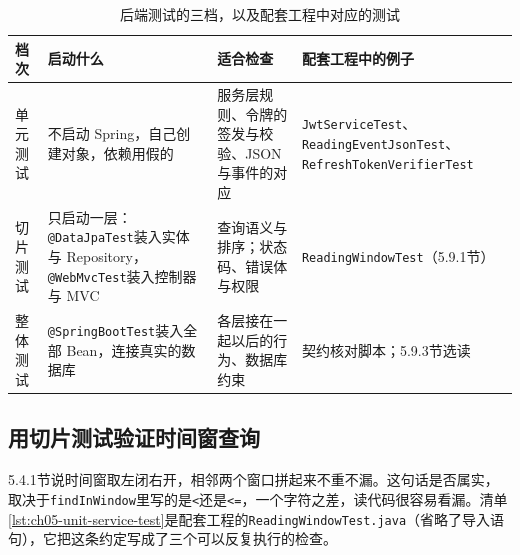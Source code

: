 \begin{table}[htbp]
\centering
\small
\caption{后端测试的三档，以及配套工程中对应的测试}
\label{tab:ch05-test-scenarios}
\begin{tabular}{p{}p{}p{}p{}}
\toprule
档次 & 启动什么 & 适合检查 & 配套工程中的例子 \\
\midrule
单元测试 & 不启动 Spring，自己创建对象，依赖用假的 & 服务层规则、令牌的签发与校验、JSON 与事件的对应 & \texttt{JwtServiceTest}、\texttt{ReadingEvent}\allowbreak\texttt{JsonTest}、\texttt{RefreshToken}\allowbreak\texttt{VerifierTest} \\
切片测试 & 只启动一层：\texttt{@DataJpaTest}装入实体与 Repository，\texttt{@WebMvcTest}装入控制器与 MVC & 查询语义与排序；状态码、错误体与权限 & \texttt{ReadingWindowTest}（5.9.1节） \\
整体测试 & \texttt{@SpringBootTest}装入全部 Bean，连接真实的数据库 & 各层接在一起以后的行为、数据库约束 & 契约核对脚本；5.9.3节选读 \\
\bottomrule
\end{tabular}
\end{table}

\subsection{用切片测试验证时间窗查询}

5.4.1节说时间窗取左闭右开，相邻两个窗口拼起来不重不漏。这句话是否属实，取决于\texttt{findInWindow}里写的是\texttt{<}还是\texttt{<=}，一个字符之差，读代码很容易看漏。清单\ref{lst:ch05-unit-service-test}是配套工程的\texttt{ReadingWindowTest.java}（省略了导入语句），它把这条约定写成了三个可以反复执行的检查。

